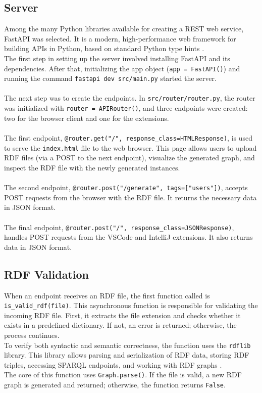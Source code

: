 \subsection{Server} 
Among the many Python libraries available for creating a REST web service, FastAPI was selected. It is a modern, high-performance web framework for building APIs in Python, based on standard Python type hints \cite{fastapi}.
\\
The first step in setting up the server involved installing FastAPI and its dependencies. After that, initializing the app object (\texttt{app = FastAPI()}) and running the command \texttt{fastapi dev src/main.py} started the server.
\\
\\
The next step was to create the endpoints. In \texttt{src/router/router.py}, the router was initialized with \texttt{router = APIRouter()}, and three endpoints were created: two for the browser client and one for the extensions.
\\
\\
The first endpoint, \texttt{@router.get("/", response\_class=HTMLResponse)}, is used to serve the \texttt{index.html} file to the web browser. This page allows users to upload RDF files (via a POST to the next endpoint), visualize the generated graph, and inspect the RDF file with the newly generated instances.
\\
\\
The second endpoint, \texttt{@router.post("/generate", tags=["users"])}, accepts POST requests from the browser with the RDF file. It returns the necessary data in JSON format.
\\
\\
The final endpoint, \texttt{@router.post("/", response\_class=JSONResponse)}, handles POST requests from the VSCode and IntelliJ extensions. It also returns data in JSON format.

\subsection{RDF Validation} 
When an endpoint receives an RDF file, the first function called is \texttt{is\_valid\_rdf(file)}. This asynchronous function is responsible for validating the incoming RDF file. First, it extracts the file extension and checks whether it exists in a predefined dictionary. If not, an error is returned; otherwise, the process continues.
\\
To verify both syntactic and semantic correctness, the function uses the \texttt{rdflib} library. This library allows parsing and serialization of RDF data, storing RDF triples, accessing SPARQL endpoints, and working with RDF graphs \cite{rdflib}.
\\
The core of this function uses \texttt{Graph.parse()}. If the file is valid, a new RDF graph is generated and returned; otherwise, the function returns \texttt{False}.

